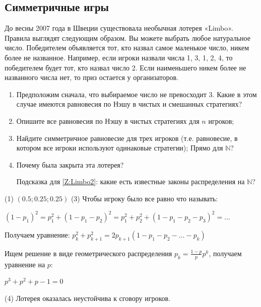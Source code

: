 \subsection{Симметричные игры}

\begin{problem}[Limbo.]
До весны 2007 года в Швеции существовала необычная лотерея «Limbo». Правила выглядят следующим образом. Вы можете выбрать любое натуральное число. Победителем объявляется тот, кто назвал самое маленькое число, никем более не названное. Например, если игроки назвали числа 1, 3, 1, 2, 4, то победителем будет тот, кто назвал число 2. Если наименьшего никем более не названного числа нет, то приз остается у организаторов. \par
\begin{enumerate}
\item Предположим сначала, что выбираемое число не превосходит 3. Какие в этом случае имеются равновесия по Нэшу в чистых и смешанных стратегиях?
\item  Опишите все равновесия по Нэшу в чистых стратегиях для $n$ игроков;\par
\item\label{Z:Limbo2} Найдите симметричное равновесие для трех игроков (т.е. равновесие, в котором все игроки используют одинаковые стратегии); {\red Прямо для $\mathbb{N}$}? \par
\item  Почему была закрыта эта лотерея? \par
Подсказка для \ref{Z:Limbo2}: какие есть известные законы распределения на $\mathbb{N}$?
\end{enumerate}

\begin{sol}
(1)
$(0.5;0.25;0.25)$
(3)
Чтобы игроку было все равно что называть:

$(1-p_1)^2 = p_1^2+(1-p_1-p_2)^2 = p_1^2+p_2^2+(1-p_1-p_2-p_3)^2 =\ldots $

Получаем уравнение:
$p_{k}^{2}+p_{k+1}^{2}=2p_{k+1}(1-p_{1}-p_{2}-\ldots -p_{k})$

Ищем решение в виде геометрического распределения $p_{k}=\frac{1-p}{p}p^{k}$, получаем уравнение на $p$:\par
$p^{3}+p^{2}+p-1=0$ \par

(4)  Лотерея оказалась неустойчива к сговору игроков.
\end{sol}
\end{problem}




